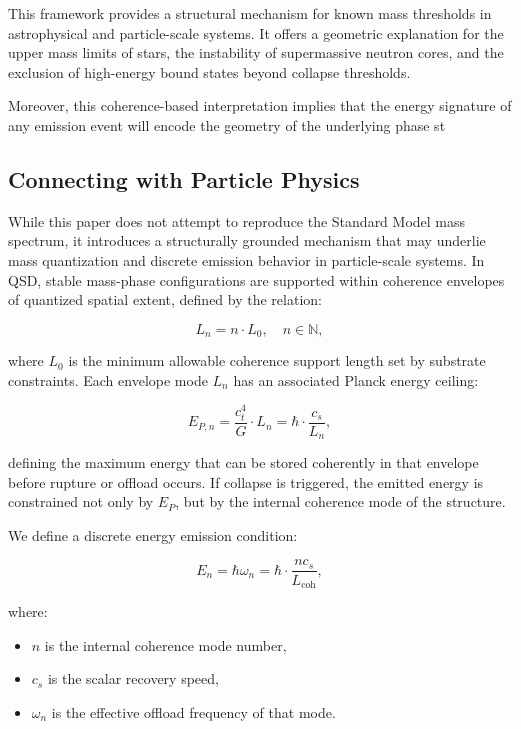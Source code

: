 \documentclass[entropy,article,submit,pdftex,moreauthors]{Definitions/mdpi}
\begin{document}
This framework provides a structural mechanism for known mass thresholds in astrophysical and particle-scale systems. It offers a geometric explanation for the upper mass limits of stars, the instability of supermassive neutron cores, and the exclusion of high-energy bound states beyond collapse thresholds.

Moreover, this coherence-based interpretation implies that the energy signature of any emission event will encode the geometry of the underlying phase st
\subsection{Connecting with Particle Physics}

While this paper does not attempt to reproduce the Standard Model mass spectrum, it introduces a structurally grounded mechanism that may underlie mass quantization and discrete emission behavior in particle-scale systems. In QSD, stable mass-phase configurations are supported within coherence envelopes of quantized spatial extent, defined by the relation:

\begin{equation}
L_n = n \cdot L_0, \quad n \in \mathbb{N},
\end{equation}

where $L_0$ is the minimum allowable coherence support length set by substrate constraints. Each envelope mode $L_n$ has an associated Planck energy ceiling:

\begin{equation}
E_{P,n} = \frac{c_t^4}{G} \cdot L_n = \hbar \cdot \frac{c_s}{L_n},
\end{equation}

defining the maximum energy that can be stored coherently in that envelope before rupture or offload occurs. If collapse is triggered, the emitted energy is constrained not only by $E_P$, but by the internal coherence mode of the structure.

We define a discrete energy emission condition:

\begin{equation}
E_n = \hbar \omega_n = \hbar \cdot \frac{n c_s}{L_{\text{coh}}},
\end{equation}

where:
\begin{itemize}
  \item $n$ is the internal coherence mode number,
  \item $c_s$ is the scalar recovery speed,
  \item $\omega_n$ is the effective offload frequency of that mode.
\end{itemize}
\end{document}
